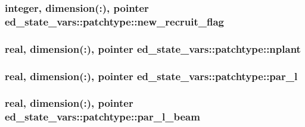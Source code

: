 \subsubsection[{\texorpdfstring{new\+\_\+recruit\+\_\+flag}{new_recruit_flag}}]{\setlength{\rightskip}{0pt plus 5cm}integer, dimension(\+:), pointer ed\+\_\+state\+\_\+vars\+::patchtype\+::new\+\_\+recruit\+\_\+flag}\hypertarget{structed__state__vars_1_1patchtype_ab7f011c4ea85c061d6d24ca6b810fc1a}{}\label{structed__state__vars_1_1patchtype_ab7f011c4ea85c061d6d24ca6b810fc1a}
\subsubsection[{\texorpdfstring{nplant}{nplant}}]{\setlength{\rightskip}{0pt plus 5cm}real, dimension(\+:), pointer ed\+\_\+state\+\_\+vars\+::patchtype\+::nplant}\hypertarget{structed__state__vars_1_1patchtype_a5fad70e77b662c79e2c4276d9de1f568}{}\label{structed__state__vars_1_1patchtype_a5fad70e77b662c79e2c4276d9de1f568}
\subsubsection[{\texorpdfstring{par\+\_\+l}{par_l}}]{\setlength{\rightskip}{0pt plus 5cm}real, dimension(\+:), pointer ed\+\_\+state\+\_\+vars\+::patchtype\+::par\+\_\+l}\hypertarget{structed__state__vars_1_1patchtype_adf0813a731ebbe9e4f1266622a6db9c8}{}\label{structed__state__vars_1_1patchtype_adf0813a731ebbe9e4f1266622a6db9c8}
\subsubsection[{\texorpdfstring{par\+\_\+l\+\_\+beam}{par_l_beam}}]{\setlength{\rightskip}{0pt plus 5cm}real, dimension(\+:), pointer ed\+\_\+state\+\_\+vars\+::patchtype\+::par\+\_\+l\+\_\+beam}\hypertarget{structed__state__vars_1_1patchtype_ade6134efe65b24fa32019162c1c88100}{}\label{structed__state__vars_1_1patchtype_ade6134efe65b24fa32019162c1c88100}
